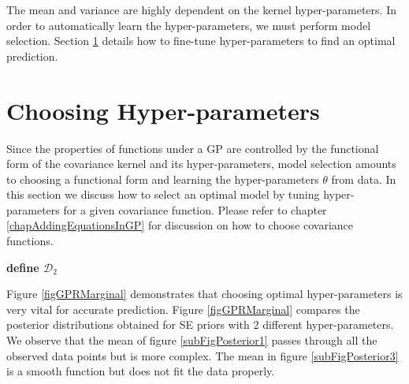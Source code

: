 The mean and variance are highly dependent on the kernel hyper-parameters. In order to automatically learn the hyper-parameters, we must perform model selection. Section \ref{secHyperParameter} details how to fine-tune hyper-parameters to find an optimal prediction.

\section{Choosing Hyper-parameters}\label{secHyperParameter}
Since the properties of functions under a GP are controlled by the functional form of the covariance kernel and its hyper-parameters, model selection amounts to choosing a functional form and learning the hyper-parameters $\theta$ from data. In this section we discuss how to select an optimal model by tuning hyper-parameters for a given covariance function. Please refer to chapter \ref{chapAddingEquationsInGP} for discussion on how to choose covariance functions. 


\textbf{define $\mathcal{D}_{2}$}

Figure \ref{figGPRMarginal} demonstrates that choosing optimal hyper-parameters is very vital for accurate prediction. Figure  \ref{figGPRMarginal} compares the posterior distributions obtained for SE priors with 2 different hyper-parameters. We observe that the mean of figure \ref{subFigPosterior1} passes through all the observed data points but is more complex. The mean in figure \ref{subFigPosterior3} is a smooth function but does not fit the data properly. 

